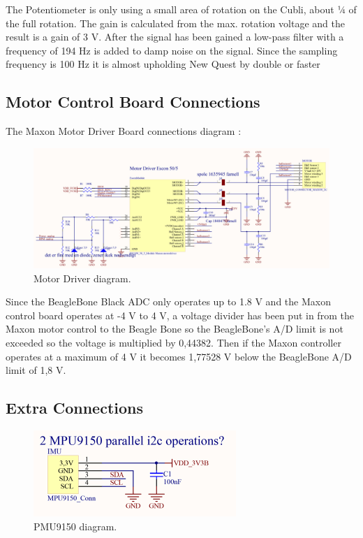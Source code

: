 The Potentiometer is only using a small area of rotation on the Cubli, about ¼ of the full rotation. The gain is calculated from the max. rotation voltage and the result is a gain of 3 V. After the signal has been gained a low-pass filter with a frequency of 194 Hz is added to damp noise on the signal. Since the sampling frequency is 100 Hz it is almost upholding New Quest by double or faster

\subsection{Motor Control Board Connections}
The Maxon Motor Driver Board connections diagram :\\

\begin{figure}[H]
	\centering
	\includegraphics[scale=0.92]{figures/MotorDriver.pdf}
	\caption{Motor Driver diagram.}
	\label{labMotorDriver}
\end{figure}\vspace{-5mm}

Since the BeagleBone Black ADC only operates up to 1.8 V and the Maxon control board operates at -4 V to 4 V, a voltage divider has been put in from the Maxon motor control to the Beagle Bone so the BeagleBone’s A/D limit is not exceeded so the voltage is multiplied by 0,44382. Then if the Maxon controller operates at a maximum of 4 V it becomes 1,77528 V below the BeagleBone A/D limit of 1,8 V.

\subsection{Extra Connections}
\begin{figure}[H]
	\centering
	\includegraphics[scale=0.92]{figures/PMU9150.pdf}
	\caption{PMU9150 diagram.}
	\label{labPMU9150}
\end{figure}\vspace{-5mm}

